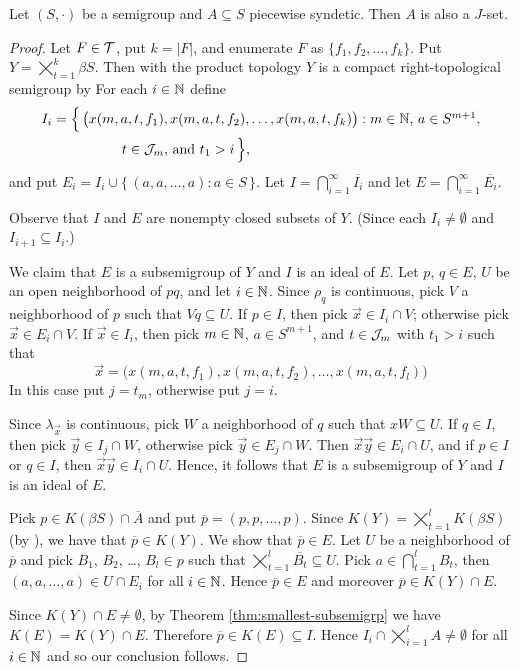 \begin{thm}
  Let $(S, \cdot)$ be a semigroup and $A \subseteq S$ piecewise syndetic.
  Then $A$ is also a $J$-set.
\end{thm}
\begin{proof}
  Let $F \in \mathcal{T}$, put $k = |F|$, and enumerate $F$ as $\{f_1, f_2, \ldots, f_k\}$.
  Put $Y = \bigtimes_{t=1}^k \beta S$. 
  Then with the product topology $Y$ is a compact right-topological semigroup by \cite[Theorem 2.22]{Hindman:1998fk}
  For each $i \in \mathbb{N}$ define
  \begin{align*}
    I_i &= \Bigl\{\, \bigl( x(m, a, t, f_1), x(m, a, t, f_2), \ldots,
    x(m, a, t, f_k) \bigr) : \mbox{$m \in \mathbb{N}$, $a \in S^{m+1}$,} \\
    &\hspace{5em} \mbox{$t \in \mathcal{J}_m$, and $t_1 > i$}
    \,\Bigr\},
  \end{align*}
  and put $E_i = I_i \cup \{\, (a, a, \ldots, a) : a \in S \,\}$.
  Let $I = \bigcap_{i=1}^\infty \overline{I_i}$ and let $E = \bigcap_{i=1}^\infty \overline{E_i}$.

  Observe that $I$ and $E$ are nonempty closed subsets of $Y$.
  (Since each $I_i \ne \emptyset$ and $I_{i+1} \subseteq I_i$.)

  We claim that $E$ is a subsemigroup of $Y$ and $I$ is an ideal of $E$.
  Let $p$, $q \in E$, $U$ be an open neighborhood of $pq$, and let $i \in \mathbb{N}$. 
  Since $\rho_q$ is continuous, pick $V$ a neighborhood of $p$ such that $Vq \subseteq U$. 
  If $p \in I$, then pick $\vec{x} \in I_i \cap V$; otherwise pick $\vec{x} \in E_i \cap V$.
  If $\vec{x} \in I_i$, then pick $m \in \mathbb{N}$, $a \in S^{m+1}$, and $t \in \mathcal{J}_m$ with $t_1 > i$ such that
  \[
    \vec{x} = \bigl( x(m, a, t, f_1), x(m, a, t, f_2), \ldots, x(m,
    a, t, f_l) \bigr)
  \]
  In this case put $j = t_m$, otherwise put $j=i$. 

  Since $\lambda_{\vec{x}}$ is continuous, pick $W$ a neighborhood of $q$ such that $xW \subseteq U$. 
  If $q \in I$, then pick $\vec{y} \in I_j \cap W$, otherwise pick $\vec{y} \in E_j \cap W$.
  Then $\vec{x} \vec{y} \in E_i \cap U$, and if $p \in I$ or $q \in I$, then $\vec{x} \vec{y} \in I_i \cap U$. 
  Hence, it follows that $E$ is a subsemigroup of $Y$ and $I$ is an ideal of $E$.

  Pick $p \in K(\beta S) \cap \overline{A}$ and put $\overline{p} = (p, p, \ldots, p)$. 
  Since $K(Y) = \bigtimes_{t=1}^l K(\beta S)$ (by \cite[Theorem 2.23]{Hindman:1998fk}), we have that $\overline{p} \in K(Y)$. 
  We show that $\overline{p} \in E$.
  Let $U$ be a neighborhood of $\overline{p}$ and pick $B_1$, $B_2$, \dots, $B_l \in p$ such that $\bigtimes_{t=1}^l \overline{B_t} \subseteq U$. 
  Pick $a \in \bigcap_{t=1}^l B_t$, then $(a, a, \ldots, a) \in U \cap E_i$ for all $i \in \mathbb{N}$. 
  Hence $\overline{p} \in E$ and moreover $\overline{p} \in K(Y) \cap E$.

  Since $K(Y) \cap E \ne \emptyset$, by Theorem \ref{thm:smallest-subsemigrp} we have $K(E) = K(Y) \cap E$.
  Therefore $\overline{p} \in K(E) \subseteq I$.
  Hence $I_i \cap \bigtimes_{i=1}^l A \ne \emptyset$ for all $i \in \mathbb{N}$ and so our conclusion follows.
\end{proof}

